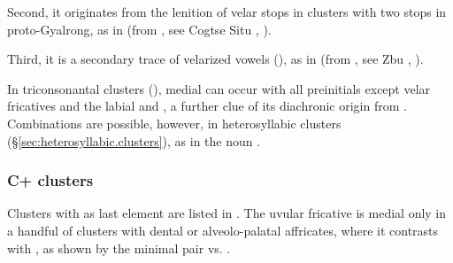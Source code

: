 Second, it originates from the lenition of velar stops in clusters with two stops in proto-Gyalrong, as in  (from , see Cogtse Situ , \citealt{huangsun02}).

Third, it is a secondary trace of velarized vowels (\citealt[231]{jacques04these}), as in  (from , see Zbu , \citealt[13]{gong18these}).

In triconsonantal clusters (),  medial  can occur with all preinitials except velar fricatives and the labial  and , a further clue of its diachronic origin from . Combinations  are possible, however, in heterosyllabic clusters (§\ref{sec:heterosyllabic.clusters}), as in the noun .

\subsubsection{C+ clusters} \label{sec:CRR.clusters}
Clusters with  as last element are listed in . The uvular fricative is medial only in a handful of clusters with dental or alveolo-palatal affricates, where it contrasts with , as shown by the minimal pair  vs. .

